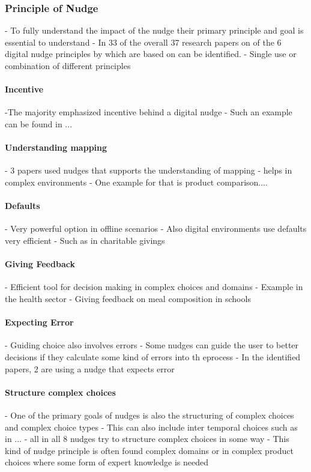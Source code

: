 \subsubsection{Principle of Nudge} %
- To fully understand the impact of the nudge their primary principle and goal is essential to understand
- In 33 of the overall 37 research papers on of the 6 digital nudge principles by \cite{weinmann_digital_2016} which are based on \cite{thaler_nudge:_2009} can be identified.
- Single use or combination of different principles
\paragraph{Incentive}
-The majority emphasized incentive behind a digital nudge
- Such an example can be found in ... 
\paragraph{Understanding mapping}
- 3 papers used nudges that supports the understanding of mapping
- helps in complex environments
- One example for that is product comparison.... 
\paragraph{Defaults}
- Very powerful option in offline scenarios \cite{johnson_defaults_2003}
- Also digital environments use defaults very efficient
- Such as in charitable givings
\paragraph{Giving Feedback}
- Efficient tool for decision making in complex choices and domains
- Example in the health sector
- Giving feedback on meal composition in schools
\paragraph{Expecting Error}
- Guiding choice also involves errors
- Some nudges can guide the user to better decisions if they calculate some kind of errors into th eprocess
- In the identified papers, 2 are using a nudge that expects error
\paragraph{Structure complex choices}
- One of the primary goals of nudges is also the structuring of complex choices and complex choice types
- This can also include inter temporal choices such as in ...
- all in all 8 nudges try to structure complex choices in some way
- This kind of nudge principle is often found complex domains or in complex product choices where some form of expert knowledge is needed

